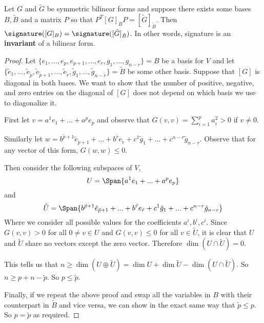\begin{thm}  Let $G$ and $\tilde{G}$ be symmetric bilinear forms and suppose there exists some bases $B,\tilde{B}$ and a matrix $P$ so that $P^T [G]_B P = [\tilde{G}]_{\tilde{B}}$. Then $\signature([G]_B)=\signature([\tilde{G}]_{\tilde{B}})$. In other words, signature is an \textbf{invariant} of a bilinear form.
\end{thm}
\begin{proof}
    Let $\{e_1,...,e_p,e_{p+1},...,e_r,g_1,...,g_{n-r}\}= B$ be a basis for $V$ and let $\{\tilde{e}_1,...,\tilde{e}_{\tilde{p}},\tilde{e}_{\tilde{p}+1},...,\tilde{e}_{\tilde{r}},\tilde{g}_1,...,\tilde{g}_{n-\tilde{r}}\}=\tilde{B}$ be some other basis. Suppose that $[G]$ is diagonal in both bases. We want to show that the number of positive, negative, and zero entries on the diagonal of $[G]$ does not depend on which basis we use to diagonalize it.

    First let $v = a^1e_1+...+a^pe_p$ and observe that $G(v,v) = \sum_{i=1}^p a_i^2>0$ if $v\neq 0$. 

    Similarly let $w = b^{\tilde{p}+1}\tilde{e}_{\tilde{p}+1}+...+b^{\tilde{r}}e_{\tilde{r}} + c^1\tilde{g}_1+...+c^{n-r}\tilde{g}_{n-r}$. Observe that for any vector of this form, $G(w,w)\leq 0$. 

    Then consider the following subspaces of $V$, 
    \[U = \Span \{a^1e_1+...+a^pe_p\}\] and \[\tilde{U} = \Span\{b^{\tilde{p}+1}\tilde{e}_{\tilde{p}+1}+...+b^{\tilde{r}}e_{\tilde{r}} + c^1\tilde{g}_1+...+c^{n-r}\tilde{g}_{n-r}\}\]
    Where we consider all possible values for the coefficients $a^i,b^i,c^i$. Since $G(v,v)>0$ for all $0\neq v \in U$ and $G(v,v)\leq 0$ for all $v\in \tilde{U}$, it is clear that $U$ and $\tilde{U}$ share no vectors except the zero vector. Therefore $\dim (U\cap \tilde{U})=0$.
    
    This tells us that $n\geq \dim(U\oplus \tilde{U}) = \dim U + \dim \tilde{U}-\dim(U\cap \tilde{U})$. So $n\geq p+n-\tilde{p}$. So $p\leq \tilde{p}$. 

    Finally, if we repeat the above proof and swap all the variables in $B$ with their counterpart in $\tilde{B}$ and vice versa,
    we can show in the exact same way that $\tilde{p}\leq p$. So $p=\tilde{p}$ as required.
\end{proof}